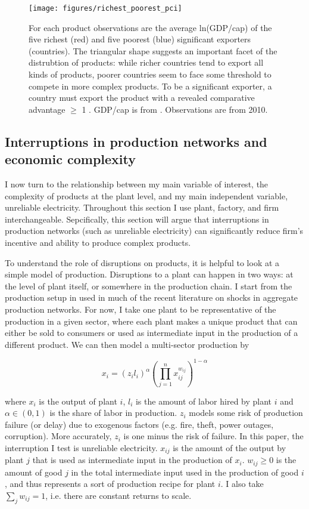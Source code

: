\documentclass[11pt]{article}
\begin{document}
\begin{figure}[htpb]
	\centering
	\texttt{[image: figures/richest\_poorest\_pci]}
	\caption{For each product observations are the average ln(GDP/cap) of the five richest (red) and five poorest (blue) significant exporters (countries). The triangular shape suggests an important facet of the distrubtion of products: while richer countries tend to export all kinds of products, poorer countries seem to face some threshold to compete in more complex products. To be a significant exporter, a country must export the product with a revealed comparative advantage \(\geq\) 1  \citep{balassa_trade_1965}. GDP/cap is from \cite{world_bank_world_2020-1}. Observations are from 2010.}%
	\label{fig:framework-least-most}
\end{figure}


\subsection{Interruptions in production networks and economic complexity}
\label{sec:production_networks}
I now turn to the relationship between my main variable of interest, the complexity of products at the plant level, and my main independent variable, unreliable electricity. Throughout this section I use plant, factory, and firm interchangeable. Sepcifically, this section will argue that interruptions in production networks (such as unreliable electricity) can significantly reduce firm's incentive and ability to produce complex products.

To understand the role of disruptions on products, it is helpful to look at a simple model of production. Disruptions to a plant can happen in two ways: at the level of plant itself, or somewhere in the production chain. I start from the production setup in \cite{acemoglu_network_2012} used in much of the recent literature on shocks in aggregate production networks. For now, I take one plant to be representative of the production in a given sector, where each plant makes a unique product that can either be sold to consumers or used as intermediate input in the production of a different product. We can then model a multi-sector production by

\[
x_i =  (z_i l_i)^{\alpha}(\prod^{n}_{j = 1} x_{ij}^{w_{ij}})^{1 - \alpha}
\]

where $x_i$ is the output of plant $i$, \(l_i\) is the amount of labor hired by plant \(i\) and \(\alpha \in (0, 1)\) is the share of labor in production. \(z_i\) models some risk of production failure (or delay) due to exogenous factors (e.g. fire, theft, power outages, corruption). More accurately, \(z_i\) is one minus the risk of failure. In this paper, the interruption I test is unreliable electricity. \(x_{ij}\) is the amount of the output by plant \(j\) that is used as intermediate input in the production of \(x_i\). \(w_{ij} \geq 0\) is the amount of good \(j\) in the total intermediate input used in the production of good \(i\), and thus represents a sort of production recipe for plant \(i\). I also take \(\sum_j w_{ij} = 1\), i.e. there are constant returns to scale.
\end{document}
